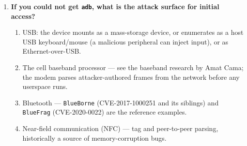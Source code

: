 \documentclass[12pt]{Training}
\begin{document}
\begin{enumerate}
\begin{enumerate}
        \item Kernel drivers exposing \lstinline{/dev} entries --- the \lstinline{file_operations} verbs of each character device.
        \item \lstinline{debuggerd}/\lstinline{crash_dump} processing of executables --- a parser of attacker-authored crash state.
        \item GPUs: Mali and \lstinline{kgsl} (Adreno) --- the largest vendor-written surface on a modern phone.
        \item Special file-system operations, for example the \lstinline{cryptfs} functions and the FUSE-based storage daemon.
        \item Daemons listening on UNIX domain sockets --- \lstinline{vold}, \lstinline{netd}, \lstinline{installd}, \lstinline{zygote} and the vendor HALs.
        \item Android services, especially those that do not check root or are vendor-provided --- Binder services reachable from a \lstinline{shell} or app context.
        \item Binder itself --- CVE-2019-2215 is the canonical Binder use-after-free, and the driver remains a high-value target.
        \item TrustZone drivers (\lstinline{qseecom} and friends) --- the userspace-visible half of the secure world interface.
        \item Kernel helper interfaces reachable from a shell: \lstinline{keyctl}, \lstinline{bpf}, \lstinline{io_uring} on newer kernels, \lstinline{userfaultfd} and perf events.
    \end{enumerate}
    \item \textbf{If you could not get \lstinline{adb}, what is the attack surface for initial access?}
    \begin{enumerate}
        \item USB: the device mounts as a mass-storage device, or enumerates as a host USB keyboard/mouse (a malicious peripheral can inject input), or as Ethernet-over-USB.
        \item The cell baseband processor --- see the baseband research by Amat Cama; the modem parses attacker-authored frames from the network before any userspace runs.
        \item Bluetooth --- \lstinline{BlueBorne} (CVE-2017-1000251 and its siblings) and \lstinline{BlueFrag} (CVE-2020-0022) are the reference examples.
        \item Near-field communication (NFC) --- tag and peer-to-peer parsing, historically a source of memory-corruption bugs.

\end{enumerate}
\end{enumerate}
\end{document}
